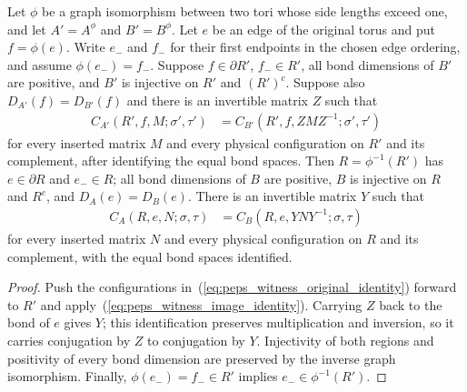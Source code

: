 \begin{lemma}%
    \label{thm:peps_edge_witness_pullback}
    \leanok
    Let $\phi$ be a graph isomorphism between two tori whose side
    lengths exceed one, and let $A'=A^\phi$ and $B'=B^\phi$.
    Let $e$ be an edge of the original torus and put $f=\phi(e)$.
    Write $e_-$ and $f_-$ for their first endpoints in the chosen edge ordering, and assume
    $\phi(e_-)=f_-$.
    Suppose $f\in\partial R'$, $f_-\in R'$, all bond dimensions
    of $B'$ are positive, and $B'$ is injective on $R'$ and $(R')^c$.
    Suppose also $D_{A'}(f)=D_{B'}(f)$ and there is an invertible
    matrix $Z$ such that
    \begin{align}
        C_{A'}(R',f,M;\sigma',\tau')
         & =C_{B'}(R',f,Z M Z^{-1};\sigma',\tau')
        \label{eq:peps_witness_image_identity}
    \end{align}
    for every inserted matrix $M$ and every physical configuration
    on $R'$ and its complement, after identifying the equal bond spaces.
    Then $R=\phi^{-1}(R')$ has $e\in\partial R$ and $e_-\in R$;
    all bond dimensions of $B$ are positive, $B$ is injective on $R$
    and $R^c$, and $D_A(e)=D_B(e)$.
    There is an invertible matrix $Y$ such that
    \begin{align}
        C_A(R,e,N;\sigma,\tau)
         & =C_B(R,e,Y N Y^{-1};\sigma,\tau)
        \label{eq:peps_witness_original_identity}
    \end{align}
    for every inserted matrix $N$ and every physical configuration
    on $R$ and its complement, with the equal bond spaces identified.
\end{lemma}
\begin{proof}\leanok
    Push the configurations in~(\ref{eq:peps_witness_original_identity})
    forward to $R'$ and apply~(\ref{eq:peps_witness_image_identity}).
    Carrying $Z$ back to the bond of $e$ gives $Y$; this identification
    preserves multiplication and inversion, so it carries conjugation
    by $Z$ to conjugation by $Y$.
    Injectivity of both regions and positivity of every bond dimension
    are preserved by the inverse graph isomorphism.
    Finally, $\phi(e_-)=f_-\in R'$ implies $e_-\in\phi^{-1}(R')$.
\end{proof}

